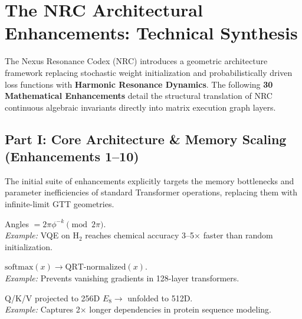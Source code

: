 \section{The NRC Architectural Enhancements: Technical Synthesis}

The Nexus Resonance Codex (NRC) introduces a geometric architecture framework replacing stochastic weight initialization and probabilistically driven loss functions with \textbf{Harmonic Resonance Dynamics}. The following \textbf{30 Mathematical Enhancements} detail the structural translation of NRC continuous algebraic invariants directly into matrix execution graph layers.

\subsection{Part I\@: Core Architecture \& Memory Scaling (Enhancements 1--10)}

The initial suite of enhancements explicitly targets the memory bottlenecks and parameter inefficiencies of standard Transformer operations, replacing them with infinite-limit GTT geometries.

\begin{tcolorbox}[
	enhanced,
	colback=nrccream!85!white,
	colframe=nrcblue,
	boxrule=0.5mm,
	title=\textbf{1. $\phi$-spiral parameter initialization}
	]
	Angles $= 2\pi \phi^{-k} \pmod{2\pi}$. \\
	\textit{Example:} VQE on H$_2$ reaches chemical accuracy 3--5$\times$ faster than random initialization.
\end{tcolorbox}

\begin{tcolorbox}[
	enhanced,
	colback=nrccream!85!white,
	colframe=nrcblue,
	boxrule=0.5mm,
	title=\textbf{2. QRT softmax replacement}
	]
	$\text{softmax}(x) \to \text{QRT-normalized}(x)$. \\
	\textit{Example:} Prevents vanishing gradients in 128-layer transformers.
\end{tcolorbox}

\begin{tcolorbox}[
	enhanced,
	colback=nrccream!85!white,
	colframe=nrcblue,
	boxrule=0.5mm,
	title=\textbf{3. 512D Resonant sublattice attention}
	]
	Q/K/V projected to 256D $E_8 \to$ unfolded to 512D. \\
	\textit{Example:} Captures 2$\times$ longer dependencies in protein sequence modeling.
\end{tcolorbox}

